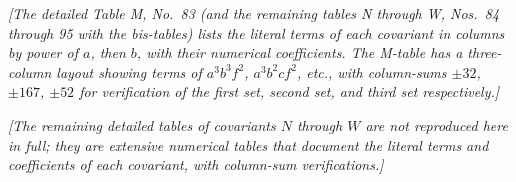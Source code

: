 \documentclass[11pt]{article}
\begin{document}
\textit{[The detailed Table M, No.~83 (and the remaining tables N through W, Nos.~84 through 95 with the bis-tables) lists the literal terms of each covariant in columns by power of $a$, then $b$, with their numerical coefficients. The M-table has a three-column layout showing terms of $a^3 b^3 f^2$, $a^3 b^2 cf^2$, etc., with column-sums $\pm 32$, $\pm 167$, $\pm 52$ for verification of the first set, second set, and third set respectively.]}

\bigskip
\noindent\textit{[The remaining detailed tables of covariants $N$ through $W$ are not reproduced here in full; they are extensive numerical tables that document the literal terms and coefficients of each covariant, with column-sum verifications.]}
\end{document}

